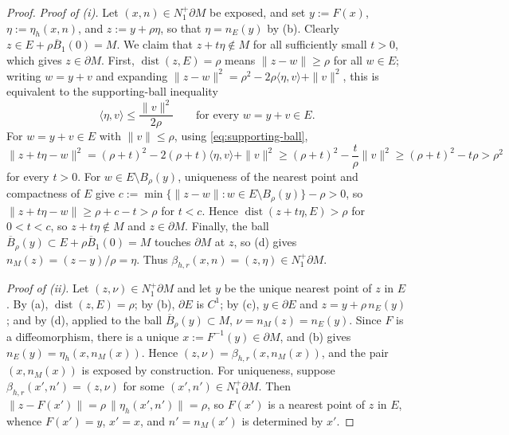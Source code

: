 \documentclass[pdflatex,sn-mathphys-num]{sn-jnl}
\numberwithin{equation}{section}
\theoremstyle{thmstyleone}%
\theoremstyle{definition}
\theoremstyle{remark}
\begin{document}
\begin{proof}
\emph{Proof of (i).} Let $(x,n)\in N^+_1\partial M$ be exposed, and set $y:=F(x)$, $\eta:=\eta_h(x,n)$, and $z:=y+\rho\eta$, so that $\eta=n_E(y)$ by (b). Clearly $z\in E+\rho\overline B_1(0)=M$. We claim that $z+t\eta\notin M$ for all sufficiently small $t>0$, which gives $z\in\partial M$. First, $\operatorname{dist}(z,E)=\rho$ means $\|z-w\|\geq\rho$ for all $w\in E$; writing $w=y+v$ and expanding $\|z-w\|^2=\rho^2-2\rho\langle\eta,v\rangle+\|v\|^2$, this is equivalent to the supporting-ball inequality
\begin{equation}
\label{eq:supporting-ball}
    \langle\eta,v\rangle
    \leq
    \frac{\|v\|^2}{2\rho}
    \qquad
    \text{for every }w=y+v\in E.
\end{equation}
For $w=y+v\in E$ with $\|v\|\leq\rho$, using
\eqref{eq:supporting-ball},
$$
    \|z+t\eta-w\|^2
    =
    (\rho+t)^2-2(\rho+t)\langle\eta,v\rangle+\|v\|^2
    \geq
    (\rho+t)^2-\frac{t}{\rho}\|v\|^2
    \geq
    (\rho+t)^2-t\rho
    >
    \rho^2
$$
for every $t>0$. For $w\in E\setminus B_\rho(y)$, uniqueness of the nearest point and compactness of $E$ give
$c:=\min\{\|z-w\|:w\in E\setminus B_\rho(y)\}-\rho>0$, so $\|z+t\eta-w\|\geq\rho+c-t>\rho$ for $t<c$. Hence
$\operatorname{dist}(z+t\eta,E)>\rho$ for $0<t<c$, so $z+t\eta\notin M$ and $z\in\partial M$. Finally, the ball
$\overline B_\rho(y)\subset E+\rho\overline B_1(0)=M$ touches $\partial M$ at $z$, so (d) gives $n_M(z)=(z-y)/\rho=\eta$. Thus $\beta_{h,r}(x,n)=(z,\eta)\in N^+_1\partial M$.

\emph{Proof of (ii).} Let $(z,\nu)\in N^+_1\partial M$ and let $y$ be the unique nearest point of $z$ in $E$. By (a), $\operatorname{dist}(z,E)=\rho$; by (b), $\partial E$ is $C^1$; by (c), $y\in\partial E$ and $z=y+\rho\,n_E(y)$; and by (d), applied to the ball $\overline B_\rho(y)\subset M$, $\nu=n_M(z)=n_E(y)$. Since $F$ is a diffeomorphism, there is a unique $x:=F^{-1}(y)\in\partial M$, and (b) gives $n_E(y)=\eta_h(x,n_M(x))$. Hence $(z,\nu)=\beta_{h,r}(x,n_M(x))$, and the pair $(x,n_M(x))$ is exposed by construction. For uniqueness, suppose $\beta_{h,r}(x',n')=(z,\nu)$ for some $(x',n')\in N^+_1\partial M$. Then $\|z-F(x')\|=\rho\,\|\eta_h(x',n')\|=\rho$, so $F(x')$ is a nearest point of $z$ in $E$, whence $F(x')=y$, $x'=x$, and $n'=n_M(x')$ is determined by $x'$.
\end{proof}
\end{document}
